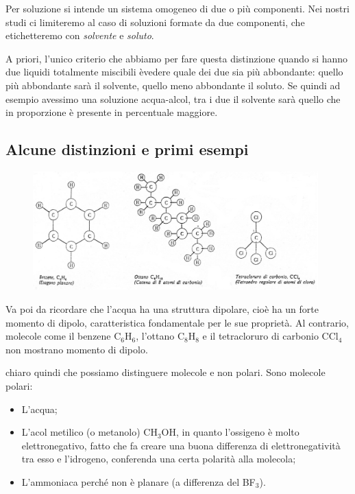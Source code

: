 Per soluzione si intende un sistema omogeneo di due o più componenti. Nei nostri studi ci limiteremo al caso di soluzioni formate da due componenti, che etichetteremo con \textit{solvente} e \textit{soluto}.

A priori, l'unico criterio che abbiamo per fare questa distinzione quando si hanno due liquidi totalmente miscibili èvedere quale dei due sia più abbondante: quello più abbondante sarà il solvente, quello meno abbondante il soluto. Se quindi ad esempio avessimo una soluzione acqua-alcol, tra i due il solvente sarà quello che in proporzione è presente in percentuale maggiore.

\subsection{Alcune distinzioni e primi esempi}

\begin{figure}[htp]
    \centering
    \includegraphics[width=11cm]{immagini/molecole_non_polari.png}
\end{figure}

Va poi da ricordare che l'acqua ha una struttura dipolare, cioè ha un forte momento di dipolo, caratteristica fondamentale per le sue proprietà. Al contrario, molecole come il benzene C$_6$H$_6$, l'ottano C$_8$H$_8$ e il tetracloruro di carbonio CCl$_4$ non mostrano momento di dipolo.

\E chiaro quindi che possiamo distinguere molecole e non polari. Sono molecole polari:

\begin{itemize}
    \item L'acqua;
    \item L'acol metilico (o metanolo) CH$_3$OH, in quanto l'ossigeno è molto elettronegativo, fatto che fa creare una buona differenza di elettronegatività tra esso e l'idrogeno, conferenda una certa polarità alla molecola;
    \item L'ammoniaca perché non è planare (a differenza del BF$_3$).
\end{itemize}

